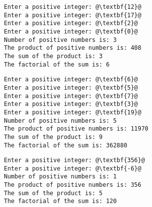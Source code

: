 \documentclass[12pt]{article}
\begin{document}
\begin{center}
\begin{minipage}{7cm}
\begin{lstlisting}[escapechar=@]
Enter a positive integer: @\textbf{12}@
Enter a positive integer: @\textbf{17}@
Enter a positive integer: @\textbf{2}@
Enter a positive integer: @\textbf{0}@
Number of positive numbers is: 3
The product of positive numbers is: 408
The sum of the product is: 3
The factorial of the sum is: 6
\end{lstlisting}
\end{minipage}
\hspace*{0.5cm}
\begin{minipage}{7cm}
\begin{lstlisting}[escapechar=@]
Enter a positive integer: @\textbf{6}@
Enter a positive integer: @\textbf{5}@
Enter a positive integer: @\textbf{7}@
Enter a positive integer: @\textbf{3}@
Enter a positive integer: @\textbf{19}@
Number of positive numbers is: 5
The product of positive numbers is: 11970
The sum of the product is: 9
The factorial of the sum is: 362880
\end{lstlisting}
\end{minipage}
\begin{minipage}{7cm}
\begin{lstlisting}[escapechar=@]
Enter a positive integer: @\textbf{356}@
Enter a positive integer: @\textbf{-6}@
Number of positive numbers is: 1
The product of positive numbers is: 356
The sum of the product is: 5
The factorial of the sum is: 120
\end{lstlisting}
\end{minipage}
\end{center}
\end{document}
